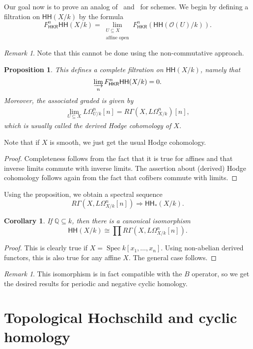 \documentclass[10pt, oneside]{memoir}
\newtheorem{cor}[thm]{Corollary}
\newtheorem{prop}[thm]{Proposition}
\theoremstyle{definition}
\theoremstyle{remark}
\newtheorem{rmk}[thm]{Remark}
\theoremstyle{plain}
\theoremstyle{definition}
\theoremstyle{remark}
\newcommand{\Q}{\mathbb{Q}}
\newcommand{\mc}[1]{\mathcal{#1}}
\newcommand{\ms}[1]{\mathsf{#1}}
\newcommand{\1}{\mathbf{1}}
\newcommand{\2}{\mathbf{2}}
\newcommand{\3}{\mathbf{3}}
\newcommand{\HH}{\ms{HH}}
\DeclareMathOperator{\Spec}{Spec}
\begin{document}
Our goal now is to prove an analog of~ and~ for schemes. We begin by defining a filtration on $\HH(X/k)$ by the formula
\[ F^n_{\ms{HKR}}\HH(X/k) = \lim_{\substack{U \subseteq X \\ \text{affine open}}} F^n_{\ms{HKR}}(\HH(\mc{O}(U)/k)). \]
\begin{rmk}
    Note that this cannot be done using the non-commutative approach.
\end{rmk}
\begin{prop}
    This defines a complete filtration on $\HH(X/k)$, namely that
    \[ \varinjlim_n F^n_{\ms{HKR}} \HH(X/k) = 0. \]
    Moreover, the associated graded is given by
    \begin{align*}
        \lim_{U \subseteq X} L\Omega^n_{U/k}[n] = R\Gamma(X, L\Omega^n_{X/k})[n],
    \end{align*}
    which is usually called the \textit{derived Hodge cohomology} of $X$.
\end{prop}
Note that if $X$ is smooth, we just get the usual Hodge cohomology.

\begin{proof}
    Completeness follows from the fact that it is true for affines and that inverse limits commute with inverse limits. The assertion about (derived) Hodge cohomology follows again from the fact that cofibers commute with limits.
\end{proof}

Using the proposition, we obtain a spectral sequence
\[ R \Gamma (X, L\Omega^n_{X/k}[n]) \Longrightarrow \HH_*(X/k). \]
\begin{cor}
    If $\Q \subseteq k$, then there is a canonical isomorphism
    \[ \HH(X/k) \cong \prod R\Gamma(X, L\Omega^n_{X/k}[n]). \]
\end{cor}

\begin{proof}
    This is clearly true if $X = \Spec k[x_1, \ldots, x_n]$. Using non-abelian derived functors, this is also true for any affine $X$. The general case follows.
\end{proof}

\begin{rmk}
    This isomorphism is in fact compatible with the $B$ operator, so we get the desired results for periodic and negative cyclic homology.
\end{rmk}

\section{Topological Hochschild and cyclic homology}%
\label{sec:Topological Hochschild homology and cyclic homology}
\end{document}
